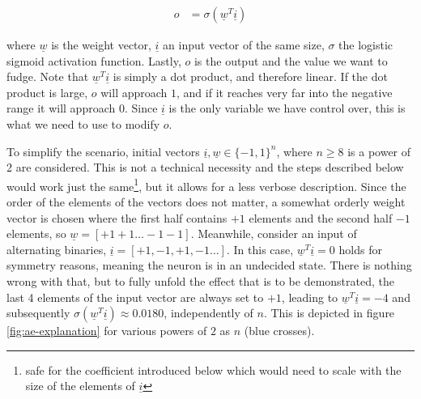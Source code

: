\documentclass[11pt, a4paper]{article}
\newcommand\braces[1]{\left(#1\right)}
\newcommand\brackets[1]{\left[#1\right]}
\renewcommand{\vec}[1]{\underline{#1}}
\begin{document}
\begin{align}
	o &= \sigma \braces{\vec{w}^T \vec{i}}
\end{align}

where $\vec{w}$ is the weight vector, $\vec{i}$ an input vector of the same size, $\sigma$ the logistic sigmoid activation function. Lastly, $o$ is the output and the value we want to fudge. Note that $\vec{w}^T \vec{i}$ is simply a dot product, and therefore linear. If the dot product is large, $o$ will approach $1$, and if it reaches very far into the negative range it will approach $0$. Since $\vec{i}$ is the only variable we have control over, this is what we need to use to modify $o$.

To simplify the scenario, initial vectors $\vec{i}, \vec{w} \in \{-1,1\}^n$, where $n \geq 8$ is a power of 2 are considered. This is not a technical necessity and the steps described below would work just the same\footnote{safe for the coefficient introduced below which would need to scale with the size of the elements of $\vec{i}$}, but it allows for a less verbose description. Since the order of the elements of the vectors does not matter, a somewhat orderly weight vector is chosen where the first half contains $+1$ elements and the second half $-1$ elements, so $\vec{w} = \brackets{+1 +1 \dots -1 -1}$. Meanwhile, consider an input of alternating binaries, $\vec{i} = \brackets{+1, -1, +1, -1 \dots}$. In this case, $\vec{w}^T \vec{i} = 0$ holds for symmetry reasons, meaning the neuron is in an undecided state. There is nothing wrong with that, but to fully unfold the effect that is to be demonstrated, the last 4 elements of the input vector are always set to $+1$, leading to $\vec{w}^T \vec{i} = -4$ and subsequently $\sigma \braces{\vec{w}^T \vec{i}} \approx 0.0180$, independently of $n$. This is depicted in figure \ref{fig:ae-explanation} for various powers of $2$ as $n$ (blue crosses).
\end{document}
